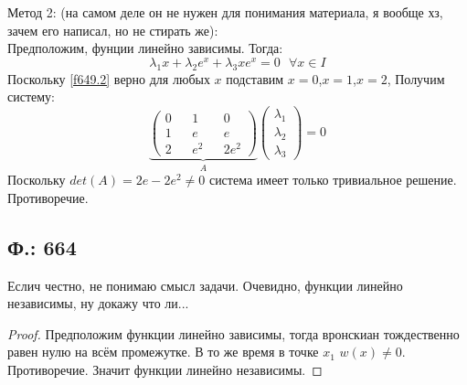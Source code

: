 \documentclass{article}
\begin{document}
Метод 2: (на самом деле он не нужен для понимания материала, я вообще хз, зачем его написал, но не стирать же):\\
Предположим, фунции линейно зависимы. Тогда:
\begin{equation}\label{f649.2}
    \lambda_1 x + \lambda_2 e^x + \lambda_3 x e^x = 0 \text{ } \forall x \in I
\end{equation}
Поскольку \ref{f649.2} верно для любых $x$ подставим $x=0$,$x=1$,$x=2$, Получим систему:
\begin{equation}
    \underbrace{
    \begin{pmatrix}
    0 && 1 && 0\\
    1 && e && e\\
    2 && e^2 && 2e^2
    \end{pmatrix}}_{A}
    \begin{pmatrix}
    \lambda_1\\
    \lambda_2\\
    \lambda_3
    \end{pmatrix}
    =0
\end{equation}
 Поскольку $det(A)=2 e - 2 e^2 \neq 0$ система имеет только тривиальное решение. Противоречие. 
 \subsection{Ф.: 664}
 Еслич честно, не понимаю смысл задачи. Очевидно, функции линейно независимы, ну докажу что ли...
 \begin{proof}
Предположим функции линейно зависимы, тогда вронскиан тождественно равен нулю на всём промежутке. В то же время в точке $x_1$ $w(x) \neq 0$. Противоречие. Значит функции линейно независимы. 
 \end{proof}
\end{document}

